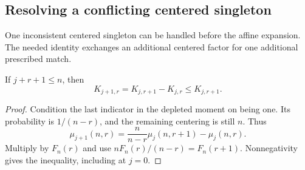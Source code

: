 \subsection{Resolving a conflicting centered singleton}

One inconsistent centered singleton can be handled before the affine expansion. The needed identity exchanges an additional centered factor for one additional prescribed match.

\begin{lemma}\label{lem:kerneldifference}
If $j+r+1\le n$, then
\[
K_{j+1,r}=K_{j,r+1}-K_{j,r}\le K_{j,r+1}.
\]
\end{lemma}
\begin{proof}
Condition the last indicator in the depleted moment on being one. Its probability is $1/(n-r)$, and the remaining centering is still $n$. Thus
\[
\mu_{j+1}(n,r)=\frac n{n-r}\mu_j(n,r+1)-\mu_j(n,r).
\]
Multiply by $F_n(r)$ and use $nF_n(r)/(n-r)=F_n(r+1)$. Nonnegativity gives the inequality, including at $j=0$.
\end{proof}

